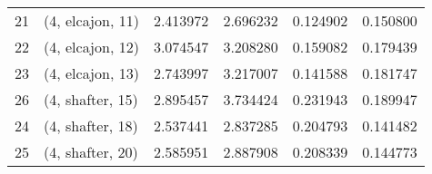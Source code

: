 \begin{tabular}{llrrrr}
21 &  (4, elcajon, 11) &   2.413972 &   2.696232 &   0.124902 &  0.150800 \\
22 &  (4, elcajon, 12) &   3.074547 &   3.208280 &   0.159082 &  0.179439 \\
23 &  (4, elcajon, 13) &   2.743997 &   3.217007 &   0.141588 &  0.181747 \\
26 &  (4, shafter, 15) &   2.895457 &   3.734424 &   0.231943 &  0.189947 \\
24 &  (4, shafter, 18) &   2.537441 &   2.837285 &   0.204793 &  0.141482 \\
25 &  (4, shafter, 20) &   2.585951 &   2.887908 &   0.208339 &  0.144773 \\
\bottomrule
\end{tabular}
